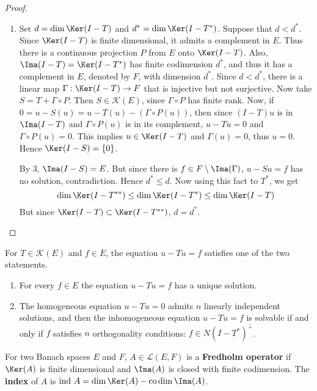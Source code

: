 \begin{proof}
\begin{enumerate}
    Conversely, Suppose that $R(I-T)=E$. The corollary 2.18 shows that $N(I-T^*)=R(I-T)^\perp = \{0\}$. Since $T^*\in \mathcal{K}(E^*)$, we get $\Ima(I-T^*)=E^*$, applying above proof. Now using corollary 2.18 again, we conclude that $\Ker(I-T)=\Ima (I-T^*)^\perp = \{0\}$.
    \item Set $d=\dim \Ker (I-T)$ and $d^*=\dim \Ker (I-T^*)$. Suppose that $d<d^*$. Since $\Ker (I-T)$ is finite dimensional, it admits a complement in $E$. Thus there is a continuous projection $P$ from $E$ onto $\Ker (I-T)$. Also, $\Ima (I-T)=\Ker (I-T^*)$ has finite codimension $d^*$, and thus it has a complement in $E$, denoted by $F$, with dimension $d^*$. Since $d<d^*$, there is a linear map $\Gamma:\Ker(I-T)\rightarrow F$ that is injective but not surjective. Now take $S=T+\Gamma\circ P$. Then $S\in \mathcal{K}(E)$, since $\Gamma\circ P$ has finite rank. Now, if $0=u-S(u)=u-T(u)-(\Gamma\circ P(u))$, then since $(I-T)u$ is in $\Ima(I-T)$ and $\Gamma\circ P(u)$ is in its complement, $u-Tu=0$ and $\Gamma\circ P(u)=0$. This implies $u\in \Ker(I-T)$ and $\Gamma(u)=0$, thus $u=0$. Hence $\Ker(I-S)=\{0\}$.
    
    By 3, $\Ima(I-S)=E$. But since there is $f\in F\setminus \Ima(\Gamma)$, $u-Su=f$ has no solution, contradiction. Hence $d^*\leq d$. Now using this fact to $T^*$, we get
    \begin{equation}
        \dim \Ker(I-T^{**})\leq \dim \Ker(I-T^*)\leq \dim \Ker(I-T)
    \end{equation}
    But since $\Ker(I-T)\subset \Ker(I-T^{**})$, $d=d^*$.
    \end{enumerate}
\end{proof}

\begin{cor} For $T\in \mathcal{K}(E)$ and $f\in E$, the equation $u-Tu=f$ satisfies one of the two statements.
\begin{enumerate}
    \item For every $f\in E$ the equation $u-Tu=f$ has a unique solution.
    \item The homogeneous equation $u-Tu=0$ admits $n$ linearly independent solutions, and then the inhomogeneous equation $u-Tu=f$ is solvable if and only if $f$ satisfies $n$ orthogonality conditions: $f\in N(I-T^*)^\perp$.
\end{enumerate}
\end{cor}

\begin{defn} For two Banach spaces $E$ and $F$, $A\in \mathcal{L}(E,F)$ is a \textbf{Fredholm operator} if $\Ker(A)$ is finite dimensional and $\Ima(A)$ is closed with finite codimension. The \textbf{index} of $A$ is $\textrm{ind } A=\dim \Ker (A)-\textrm{co}\dim \Ima (A)$.
\end{defn}


